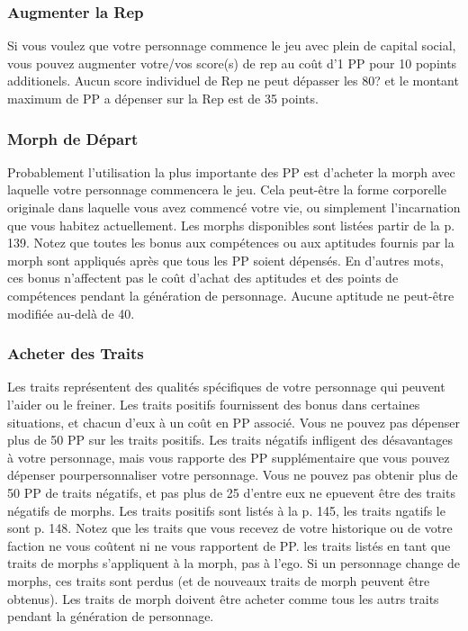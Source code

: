 \subsubsection{Augmenter la Rep} \label{sec:increasing-rep} 

Si vous voulez que votre personnage commence le jeu avec plein de capital social, vous pouvez augmenter votre/vos score(s) de rep au coût d'1 PP pour 10 popints additionels. Aucun score individuel de Rep ne peut dépasser les 80? et le montant maximum de PP a dépenser sur la Rep est de 35 points. 

\subsubsection{Morph de Départ} \label{sec:starting-morph} 

Probablement l'utilisation la plus importante des PP est d'acheter la morph avec laquelle votre personnage commencera le jeu. Cela peut-être la forme corporelle originale dans laquelle vous avez commencé votre vie, ou simplement l'incarnation que vous habitez actuellement. Les morphs disponibles sont listées  partir de la p. 139. Notez que toutes les bonus aux compétences ou aux aptitudes fournis par la morph sont appliqués après que tous les PP soient dépensés. En d'autres mots, ces bonus n'affectent pas le coût d'achat des aptitudes et des points de compétences pendant la génération de personnage. Aucune aptitude ne peut-être modifiée au-delà de 40. 

\subsubsection{Acheter des Traits} \label{sec:purchasing-traits} 

Les traits représentent des qualités spécifiques de votre personnage qui peuvent l'aider ou le freiner. Les traits positifs fournissent des bonus dans certaines situations, et chacun d'eux à un coût en PP associé. Vous ne pouvez pas dépenser plus de 50 PP sur les traits positifs. Les traits négatifs infligent des désavantages à votre personnage, mais vous rapporte des PP supplémentaire que vous pouvez dépenser pourpersonnaliser votre personnage. Vous ne pouvez pas obtenir plus de 50 PP  de traits négatifs, et pas plus de 25 d'entre eux ne epuevent être des traits négatifs de morphs. Les traits positifs sont listés à la p. 145, les traits ngatifs le sont p. 148. Notez que les traits que vous recevez de votre historique ou de votre faction ne vous coûtent ni ne vous rapportent de PP. les traits listés en tant que traits de morphs s'appliquent à la morph, pas à l'ego. Si un personnage change de morphs, ces traits sont perdus (et de nouveaux traits de morph peuvent être obtenus). Les traits de morph doivent être acheter comme tous les autrs traits pendant la génération de personnage. 

